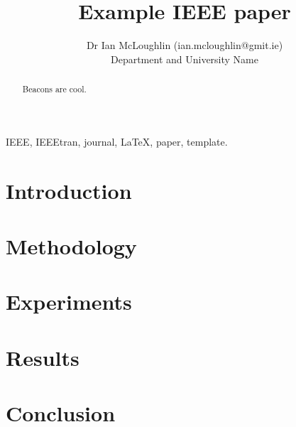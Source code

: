 \documentclass[journal]{IEEEtran}
\begin{document}
\title{Example IEEE paper}

\author{Dr Ian McLoughlin (ian.mcloughlin@gmit.ie) \\ Department and University Name}
\date{}

\maketitle


\begin{abstract}
	Beacons are cool.
\end{abstract}

\begin{IEEEkeywords}
IEEE, IEEEtran, journal, \LaTeX, paper, template.
\end{IEEEkeywords}


\section{Introduction}

\section{Methodology}

\section{Experiments}

\section{Results}

\section{Conclusion}

\end{document}
